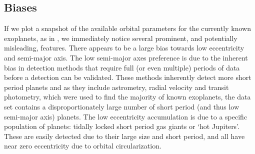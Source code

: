 \subsection{Biases}\label{sec:biases}
If we plot a snapshot of the available orbital parameters for the currently known exoplanets, as in , we immediately notice several prominent, and potentially misleading, features.  There appears to be a large bias towards low eccentricity and semi-major axis.   The low semi-major axes preference is due to the inherent bias in detection methods that require full (or even multiple) periods of data before a detection can be validated.  These methods inherently detect more short period planets and as they include astrometry, radial velocity and transit photometry, which were used to find the majority of known exoplanets, the data set contains a disproportionately large number of short period (and thus low semi-major axis) planets.  The low eccentricity accumulation is due to a specific population of planets: tidally locked short period gas giants  or `hot Jupiters'.  These are easily detected due to their large size and short period, and all have near zero eccentricity due to orbital circularization.

